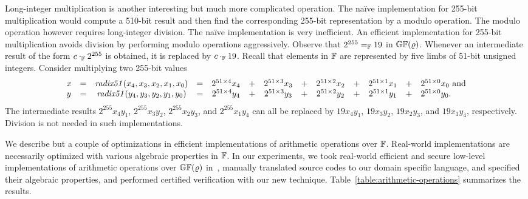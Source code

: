 Long-integer multiplication is another interesting but much more
complicated operation. The na\"ive implementation for 255-bit
multiplication would compute a 510-bit result and then find the
corresponding 255-bit representation by a modulo operation. The
modulo operation however requires long-integer division. The na\"ive
implementation is very inefficient. An efficient implementation for
255-bit multiplication avoids division by performing modulo operations
aggressively. Observe that $2^{255} =_{\mathbb{F}} 19$ in $\mathbb{GF}(\varrho)$. 
Whenever an intermediate result of the form $c \cdot_{\mathbb{F}} 2^{255}$
is obtained, it is replaced by $c \cdot_{\mathbb{F}} 19$. Recall that
elements in $\mathbb{F}$ are represented by five limbs of 51-bit unsigned
integers. Consider multiplying two 255-bit values
\begin{equation*}
  \begin{array}{lcccccccccccl}
    x & = & \mathit{radix51} (x_4, x_3, x_2, x_1, x_0) & = &
            2^{51 \times 4} x_4 & + & 2^{51 \times 3} x_3 & + &
            2^{51 \times 2} x_2 & + & 2^{51 \times 1} x_1 & + &
            2^{51 \times 0} x_0 \textmd{ and}\\
    y & = & \mathit{radix51} (y_4, y_3, y_2, y_1, y_0) & = &
            2^{51 \times 4} y_4 & + & 2^{51 \times 3} y_3 & + &
            2^{51 \times 2} y_2 & + & 2^{51 \times 1} y_1 & + &
            2^{51 \times 0} y_0.
  \end{array}
\end{equation*}
The intermediate results $2^{255} x_4 y_1$, $2^{255} x_3 y_2$,
$2^{255} x_2 y_3$, and $2^{255} x_1 y_4$ can all be replaced by 
$19 x_4 y_1$, $19 x_3 y_2$, $19 x_2 y_3$, and $19 x_1 y_4$,
respectively. Division is not needed in such implementations.

We describe but a couple of optimizations in efficient implementations
of arithmetic operations over $\mathbb{F}$. Real-world implementations
are necessarily optimized with various algebraic properties in
$\mathbb{F}$. In our experiments, we took real-world efficient and secure
low-level implementations of arithmetic operations over
$\mathbb{GF}(\varrho)$ in~, manually translated source
codes to our domain specific language, and specified their algebraic
properties, and performed certified verification with our new technique. 
Table~\ref{table:arithmetic-operations} summarizes the results.


